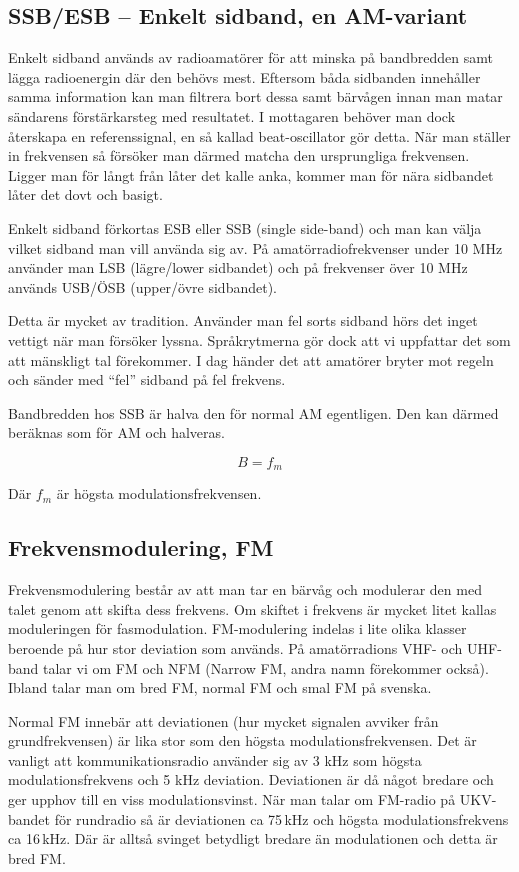 \subsection{SSB/ESB -- Enkelt sidband, en AM-variant}

Enkelt sidband används av radioamatörer för att minska på bandbredden samt
lägga radioenergin där den behövs mest. Eftersom båda sidbanden innehåller
samma information kan man filtrera bort dessa samt bärvågen innan man matar
sändarens förstärkarsteg med resultatet. I mottagaren behöver man dock
återskapa en referenssignal, en så kallad beat-oscillator gör detta. När man
ställer in frekvensen så försöker man därmed matcha den ursprungliga
frekvensen. Ligger man för långt från låter det kalle anka, kommer man för
nära sidbandet låter det dovt och basigt.

Enkelt sidband förkortas ESB eller SSB (single side-band) och man kan välja
vilket sidband man vill använda sig av. På amatörradiofrekvenser under 10 MHz
använder man LSB (lägre/lower sidbandet) och på frekvenser över 10 MHz används
USB/ÖSB (upper/övre sidbandet).

Detta är mycket av tradition. Använder man fel sorts sidband hörs det inget
vettigt när man försöker lyssna. Språkrytmerna gör dock att vi uppfattar det
som att mänskligt tal förekommer. I dag händer det att amatörer bryter mot
regeln och sänder med ``fel'' sidband på fel frekvens.

Bandbredden hos SSB är halva den för normal AM egentligen. Den kan därmed
beräknas som för AM och halveras.

\begin{equation}
	B=f_m
\end{equation}

Där $f_m$ är högsta modulationsfrekvensen.

\subsection{Frekvensmodulering, FM}

Frekvensmodulering består av att man tar en bärvåg och modulerar den med talet
genom att skifta dess frekvens. Om skiftet i frekvens är mycket litet kallas
moduleringen för fasmodulation. FM-modulering indelas i lite olika klasser
beroende på hur stor deviation som används. På amatörradions VHF- och UHF-band
talar vi om FM och NFM (Narrow FM, andra namn förekommer också). Ibland talar
man om bred FM, normal FM och smal FM på svenska.

Normal FM innebär att deviationen (hur mycket signalen avviker från
grundfrekvensen) är lika stor som den högsta modulationsfrekvensen. Det är
vanligt att kommunikationsradio använder sig av 3 kHz som högsta
modulationsfrekvens och 5 kHz deviation. Deviationen är då något bredare och ger
upphov till en viss modulationsvinst. När man talar om FM-radio på UKV-bandet
för rundradio så är deviationen ca 75\,kHz och högsta modulationsfrekvens ca
16\,kHz. Där är alltså svinget betydligt bredare än modulationen och detta är
bred FM.

